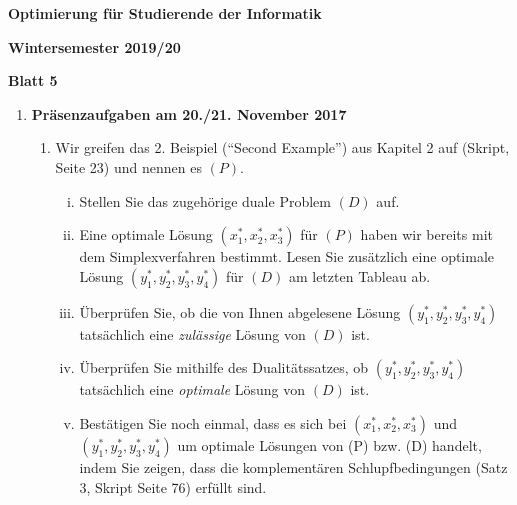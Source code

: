 \documentclass[11pt, a4paper]{article}
\begin{document}
\begin{center}
\begin{Large}
\textbf{Optimierung für Studierende der Informatik}
\end{Large}

\textbf{}
	
\vspace{0.5cm}

\textbf{Wintersemester 2019/20}

\textbf{Blatt 5}

\vspace{0.5cm}
\end{center}

\small

\begin{enumerate}[\bfseries A:]


\item \textbf{Präsenzaufgaben am 20./21. November 2017}

\begin{enumerate}[\bfseries 1.]

\item Wir greifen das 2. Beispiel (\enquote{Second Example}) aus Kapitel 2 auf (Skript, Seite 23) und nennen es $(P)$.
\begin{enumerate}[(i)]
\item Stellen Sie das zugehörige duale Problem $(D)$ auf.
\item Eine optimale Lösung $(x_1^*, x_2^*, x_3^*)$ für $(P)$ haben wir bereits mit dem Simplexverfahren bestimmt. Lesen Sie zusätzlich eine optimale Lösung $(y_1^*, y_2^*, y_3^*, y_4^*)$ für $(D)$ am letzten Tableau ab.
\item Überprüfen Sie, ob die von Ihnen abgelesene Lösung $(y_1^*, y_2^*, y_3^*, y_4^*)$ tatsächlich eine \textit{zulässige} Lösung von $(D)$ ist.
\item Überprüfen Sie mithilfe des Dualitätssatzes, ob $(y_1^*, y_2^*, y_3^*, y_4^*)$ tatsächlich eine \textit{optimale} Lösung von $(D)$ ist.
\item Bestätigen Sie noch einmal, dass es sich bei $(x_1^*, x_2^*, x_3^*)$ und $(y_1^*, y_2^*, y_3^*, y_4^*)$ um optimale Lösungen von (P) bzw. (D) handelt, indem Sie zeigen, dass die komplementären Schlupfbedingungen (Satz 3, Skript Seite 76) erfüllt sind. 


\end{enumerate}
\end{enumerate}
\end{enumerate}
\end{document}

